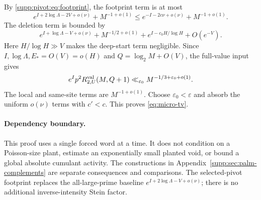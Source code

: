 By \eqref{supp:pivot:eq:footprint}, the footprint term is at most
\[
 e^{I+2\log\Lambda-2V+o(\nu)}+M^{-1+o(1)}
 \le e^{-I-2c\nu+o(\nu)}+M^{-1+o(1)}.
\]
The deletion term is bounded by
\[
 e^{I+\log\Lambda-V+o(\nu)}+M^{-1/2+o(1)}
             +e^{I-c_0H/\log H}+O(e^{-V}).
\]
Here $H/\log H\gg V$ makes the deep-start term negligible. Since
$I,\log\Lambda,E_*=O(V)=o(H)$ and $Q=\log_2 M+O(V)$, the full-value input gives
\[
 e^Ip^2R^{\rm val}_{2,U}(M,Q+1)
       \ll_{\varepsilon_0}M^{-1/3+\varepsilon_0+o(1)}.
\]
The local and same-site terms are $M^{-1+o(1)}$. Choose
$\varepsilon_0<\varepsilon$ and absorb the uniform $o(\nu)$ terms with
$c'<c$. This proves \eqref{eq:micro-tv}.

\paragraph{Dependency boundary.}
This proof uses a single forced word at a time. It does not condition on a Poisson-size plant, estimate an exponentially small planted void, or bound a global absolute cumulant activity. The constructions in Appendix~\ref{supp:sec:palm-complements} are separate consequences and comparisons. The selected-pivot footprint replaces the all-large-prime baseline $e^{I+2\log\Lambda-V+o(\nu)}$; there is no additional inverse-intensity Stein factor.
